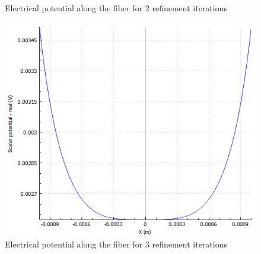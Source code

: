 \documentclass{article}
\begin{document}
\begin{figure}[htbp]
\begin{minipage}[b]{0.3\textwidth}
            \caption{Electrical potential along the fiber for 2 refinement iterations}
            \label{fig:FE_efield_along_fiber_2}
        \end{minipage}
        \hfill
        \begin{minipage}[b]{0.3\textwidth}
            \includegraphics[width=\textwidth]{FE_efield_along_fiber_3}
            \caption{Electrical potential along the fiber for 3 refinement iterations}
            \label{fig:FE_efield_along_fiber_3}
        \end{minipage}
    \end{figure}
\end{document}
